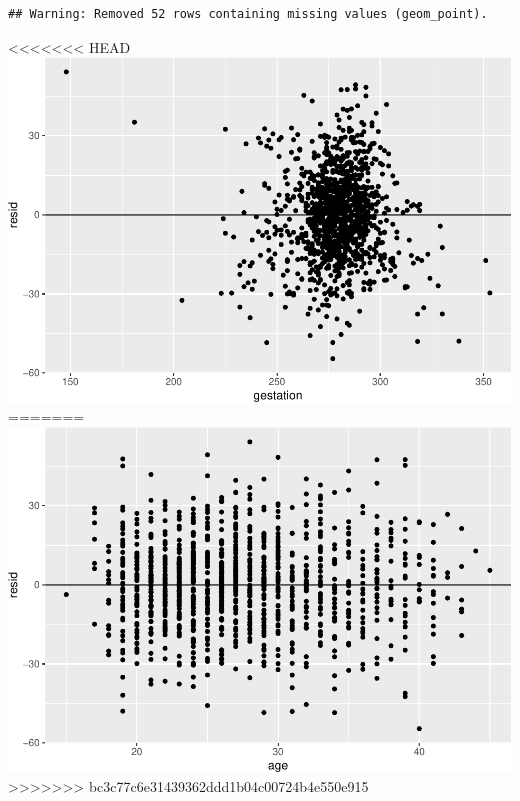 \documentclass[]{article}
\newenvironment{Shaded}{\begin{snugshade}}{\end{snugshade}}
\newcommand{\DataTypeTok}[1]{\textcolor[rgb]{0.13,0.29,0.53}{#1}}
\newcommand{\DecValTok}[1]{\textcolor[rgb]{0.00,0.00,0.81}{#1}}
\newcommand{\KeywordTok}[1]{\textcolor[rgb]{0.13,0.29,0.53}{\textbf{#1}}}
\newcommand{\NormalTok}[1]{#1}
\newcommand{\OperatorTok}[1]{\textcolor[rgb]{0.81,0.36,0.00}{\textbf{#1}}}
\newcommand{\StringTok}[1]{\textcolor[rgb]{0.31,0.60,0.02}{#1}}
\begin{document}
\begin{verbatim}
## Warning: Removed 52 rows containing missing values (geom_point).
\end{verbatim}

<<<<<<< HEAD
\includegraphics{lab-8-regression_files/figure-latex/unnamed-chunk-19-1.pdf}
=======
\includegraphics{lab-8-regression_files/figure-latex/unnamed-chunk-20-1.pdf}
>>>>>>> bc3c77c6e31439362ddd1b04c00724b4e550e915

\begin{Shaded}
\end{Shaded}
\end{document}
